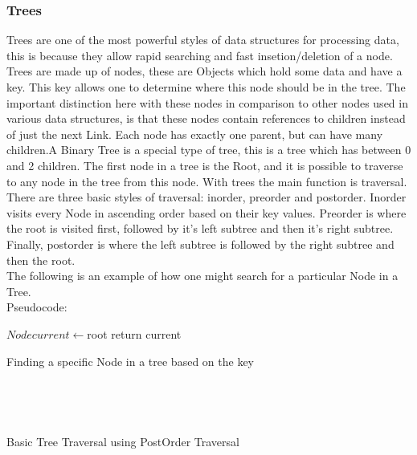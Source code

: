 \documentclass[10pt,twocolumn]{IEEEtran}
\begin{document}
	\subsubsection{Trees}
	Trees are one of the most powerful styles of data structures for processing data, this is because they allow rapid searching and fast insetion/deletion of a node. Trees are made up of nodes, these are Objects which hold some data and have a key. This key allows one to determine where this node should be in the tree. The important distinction here with these nodes in comparison to other nodes used in various data structures, is that these nodes contain references to children instead of just the next Link. Each node has exactly one parent, but can have many children.A Binary Tree is a special type of tree, this is a tree which has between 0 and 2 children. The first node in a tree is the Root, and it is possible to traverse to any node in the tree from this node.
	With trees the main function is traversal. There are three basic styles of traversal: inorder, preorder and postorder. Inorder visits every Node in ascending order based on their key values. Preorder is where the root is visited first, followed by it's left subtree and then it's right subtree. Finally, postorder is where the left subtree is followed by the right subtree and then the root. \\
The following is an example of how one might search for a particular Node in a Tree.\\
Pseudocode:
\IncMargin{1em}
\begin{algorithm}
	\SetAlgoLined
	$Node current \longleftarrow$root\;
return current\;
\caption{Finding a specific Node in a tree based on the key}
\end{algorithm}\DecMargin{1em}
\\
\IncMargin{1em}
\begin{algorithm}
	\SetAlgoLined
	\Indm{}
	\\
\caption{Basic Tree Traversal using PostOrder Traversal}
\end{algorithm}\DecMargin{1em}
\end{document}
